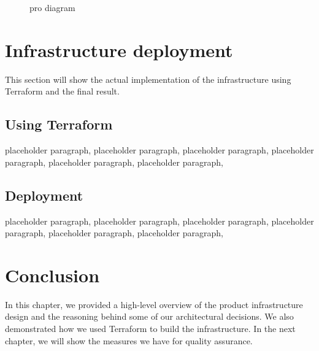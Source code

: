 \begin{figure}[!h]
    \centering
    \caption{pro diagram}
    \label{fig:pro-diagram}
\end{figure}

\section{Infrastructure deployment}
\qquad 

This section will show the actual implementation of the infrastructure using Terraform and the final result. 

\subsection{Using Terraform}

\qquad
placeholder paragraph, placeholder paragraph, placeholder paragraph, placeholder paragraph, placeholder paragraph, placeholder paragraph,
\subsection{Deployment}
\qquad
placeholder paragraph, placeholder paragraph, placeholder paragraph, placeholder paragraph, placeholder paragraph, placeholder paragraph,
\section*{Conclusion}
\qquad In this chapter, we provided a high-level overview of the product infrastructure design and the reasoning behind some of our architectural decisions. We also demonstrated how we used Terraform to build the infrastructure.
In the next chapter, we will show the measures we have for quality assurance.